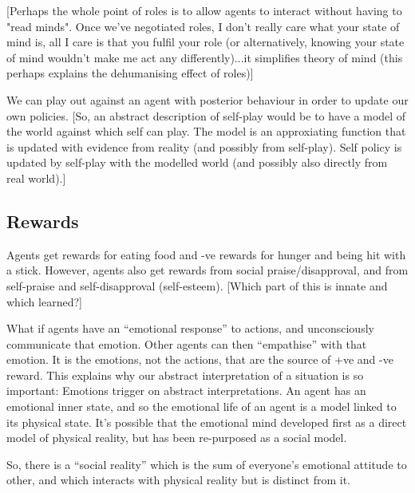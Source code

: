 \documentclass[a4paper]{report}
\begin{document}
[Perhaps the whole point of roles is to allow agents to interact without having to "read minds". Once we've negotiated roles, I don't really care what your state of mind is, all I care is that you fulfil your role (or alternatively, knowing your state of mind wouldn't make me act any differently)...it simplifies theory of mind (this perhaps explains the dehumanising effect of roles)]

We can play out against an agent with posterior behaviour in order to update our own policies. [So, an abstract description of self-play would be to have a model of the world against which self can play. The model is an approxiating function that is updated with evidence from reality (and possibly from self-play). Self policy is updated by self-play with the modelled world (and possibly also directly from real world).] 

\subsection{Rewards}

Agents get rewards for eating food and -ve rewards for hunger and being hit with a stick. However, agents also get rewards from social praise/disapproval, and from self-praise and self-disapproval (self-esteem). [Which part of this is innate and which learned?]

What if agents have an ``emotional response'' to actions, and unconsciously communicate that emotion. Other agents can then ``empathise'' with that emotion. It is the emotions, not the actions, that are the source of +ve and -ve reward. This explains why our abstract interpretation of a situation is so important: Emotions trigger on abstract interpretations. An agent has an emotional inner state, and so the emotional life of an agent is a model linked to its physical state. It's possible that the emotional mind developed first as a direct model of physical reality, but has been re-purposed as a social model.

So, there is a ``social reality'' which is the sum of everyone's emotional attitude to other, and which interacts with physical reality but is distinct from it.
\end{document}
